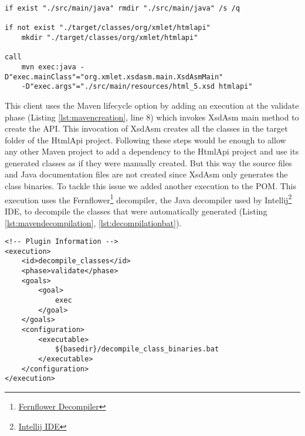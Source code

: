 
\begin{minipage}{\linewidth}
\begin{lstlisting}[caption={Maven API creation batch file (create\_class\_binaries.bat)},label={lst:creationbat}]
if exist "./src/main/java" rmdir "./src/main/java" /s /q

if not exist "./target/classes/org/xmlet/htmlapi" 
    mkdir "./target/classes/org/xmlet/htmlapi"

call 
    mvn exec:java -D"exec.mainClass"="org.xmlet.xsdasm.main.XsdAsmMain" 
    -D"exec.args"="./src/main/resources/html_5.xsd htmlapi"
\end{lstlisting}
\end{minipage}

\noindent
This client uses the Maven lifecycle option by adding an execution at the validate phase (Listing \ref{lst:mavencreation}, line 8) which invokes XsdAsm main method to create the \ac{API}. This invocation of XsdAsm creates all the classes in the target folder of the HtmlApi project. Following these steps would be enough to allow any other Maven project to add a dependency to the HtmlApi project and use its generated classes as if they were manually created. But this way the source files and Java documentation files are not created since XsdAsm only generates the class binaries. To tackle this issue we added another execution to the \ac{POM}. This execution uses the Fernflower\footnote{\href{https://mvnrepository.com/artifact/org.jboss.windup.decompiler/decompiler-fernflower/4.0.0.Final}{Fernflower Decompiler}} decompiler, the Java decompiler used by Intellij\footnote{\href{https://www.jetbrains.com/idea/}{Intellij IDE}} \ac{IDE}, to decompile the classes that were automatically generated (Listing \ref{lst:mavendecompilation}, \ref{lst:decompilationbat}). 

\bigskip


\begin{minipage}{\linewidth}
\begin{lstlisting}[caption={Maven API decompile classes plugin},label={lst:mavendecompilation}]
<!-- Plugin Information -->
<execution>
    <id>decompile_classes</id>
    <phase>validate</phase>
    <goals>
        <goal>
            exec
        </goal>
    </goals>
    <configuration>
        <executable>
            ${basedir}/decompile_class_binaries.bat
        </executable>
    </configuration>
</execution>
\end{lstlisting}
\end{minipage}

